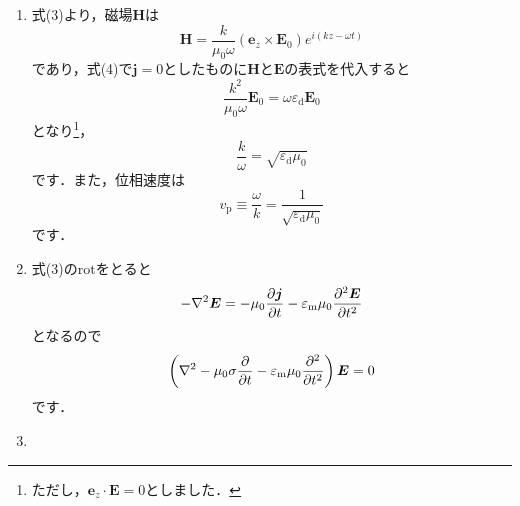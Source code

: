 \documentclass[a4paper,pdflatex,ja=standard]{bxjsarticle}
\begin{document}
\begin{enumerate}

  \item 

  式(3)より，磁場$\bm{H}$は
  \begin{equation}
    \bm{H}
    =
    \frac{k}{\mu_0\omega}(\bm{e}_z\times\bm{E}_0)
    e^{i(kz-\omega t)}
    \label{mag_field}
  \end{equation}
  であり，式(4)で$\bm{j}=0$としたものに$\bm{H}$と$\bm{E}$の表式を代入すると
  \begin{equation}
    \frac{k^2}{\mu_0\omega}\bm{E}_0
    =
    \omega\varepsilon_{\mathrm{d}}\bm{E}_0
  \end{equation}
  となり\footnote{
    ただし，$\bm{e}_z\cdot\bm{E}=0$としました．
  }，
  \begin{equation}
    \frac{k}{\omega}
    =
    \sqrt{\varepsilon_{\mathrm{d}}\mu_0}
  \end{equation}
  です．また，位相速度は
  \begin{equation}
    v_{\mathrm{p}}
    \equiv
    \frac{\omega}{k}
    =
    \frac{1}{\sqrt{\varepsilon_{\mathrm{d}}\mu_0}}
  \end{equation}
  です．


  \item

  式(3)の$\mathrm{rot}$をとると
  \begin{equation}
    -
    \nabla^2\bm{E}
    =
    -\mu_0\pdv{\bm{j}}{t}
    -\varepsilon_{\mathrm{m}}\mu_0\pdv[2]{\bm{E}}{t}
  \end{equation}
  となるので
  \begin{equation}
    \left(  
      \nabla^2
      -
      \mu_0\sigma
      \pdv{}{t}
      -
      \varepsilon_{\mathrm{m}}\mu_0\pdv[2]{}{t}      
    \right)
    \bm{E}
    =
    0
    \label{diffeq_E}
  \end{equation}
  です．


  \item


\end{enumerate}
\end{document}
